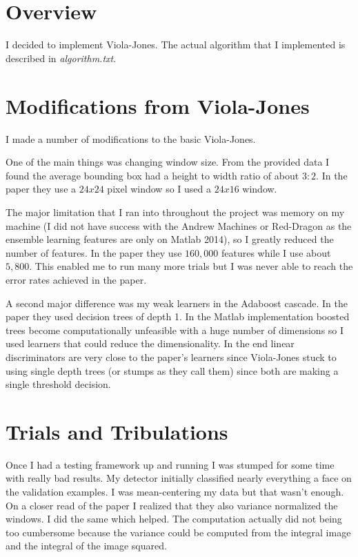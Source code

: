 \documentclass[letterpaper,12pt]{article}
\title{\className \\ \assignmentName}
\author{\myName}
\date{\dueDate}
\begin{document}
\maketitle

\section{Overview}
I decided to implement Viola-Jones. The actual algorithm that I implemented is described in \textit{algorithm.txt}.

\section{Modifications from Viola-Jones}
I made a number of modifications to the basic Viola-Jones.

One of the main things was changing window size. From the provided data I found the average bounding box had a height to width ratio of about $3:2$. In the paper they use a $24x24$ pixel window so I used a $24x16$ window.

The major limitation that I ran into throughout the project was memory on my machine (I did not have success with the Andrew Machines or Red-Dragon as the ensemble learning features are only on Matlab 2014), so I greatly reduced the number of features. In the paper they use $160,000$ features while I use about $5,800$. This enabled me to run many more trials but I was never able to reach the error rates achieved in the paper.

A second major difference was my weak learners in the Adaboost cascade. In the paper they used decision trees of depth 1. In the Matlab implementation boosted trees become computationally unfeasible with a huge number of dimensions so I used learners that could reduce the dimensionality. In the end linear discriminators are very close to the paper's learners since Viola-Jones stuck to using single depth trees (or stumps as they call them) since both are making a single threshold decision.

\section{Trials and Tribulations}
Once I had a testing framework up and running I was stumped for some time with really bad results. My detector initially classified nearly everything a face on the validation examples. I was mean-centering my data but that wasn't enough. On a closer read of the paper I realized that they also variance normalized the windows. I did the same which helped. The computation actually did not being too cumbersome because the variance could be computed from the integral image and the integral of the image squared.
\end{document}
